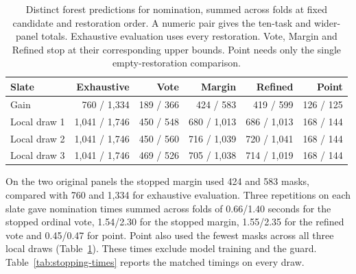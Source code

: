 \begin{table}[tb]
\centering\small
\caption{Distinct forest predictions for nomination, summed across folds at fixed candidate and restoration order. A numeric pair gives the ten-task and wider-panel totals. Exhaustive evaluation uses every restoration. Vote, Margin and Refined stop at their corresponding upper bounds. Point needs only the single empty-restoration comparison.}
\label{tab:matched-stopping}
\begin{tabular}{@{}lrrrrr@{}}
\toprule
Slate & Exhaustive & Vote & Margin & Refined & Point\\
\midrule
Gain & 760 / 1,334 & 189 / 366 & 424 / 583 & 419 / 599 & 126 / 125\\
Local draw 1 & 1,041 / 1,746 & 450 / 548 & 680 / 1,013 & 686 / 1,013 & 168 / 144\\
Local draw 2 & 1,041 / 1,746 & 450 / 560 & 716 / 1,039 & 720 / 1,041 & 168 / 144\\
Local draw 3 & 1,041 / 1,746 & 469 / 526 & 705 / 1,038 & 714 / 1,019 & 168 / 144\\
\bottomrule
\end{tabular}
\end{table}

On the two original panels the stopped margin used 424 and 583 masks, compared with 760 and 1,334 for exhaustive evaluation. Three repetitions on each slate gave nomination times summed across folds of 0.66/1.40 seconds for the stopped ordinal vote, 1.54/2.30 for the stopped margin, 1.55/2.35 for the refined vote and 0.45/0.47 for point. Point also used the fewest masks across all three local draws (Table~\ref{tab:matched-stopping}). These times exclude model training and the guard. Table~\ref{tab:stopping-times} reports the matched timings on every draw.

